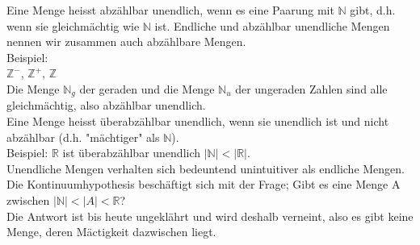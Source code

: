 \documentclass[../gruppenarbeit_1.tex]{subfiles}
\begin{document}
Eine Menge heisst abzählbar unendlich, wenn es eine Paarung mit $\mathbb{N}$ gibt, d.h. wenn sie gleichmächtig wie $\mathbb{N}$ ist.
Endliche und abzählbar unendliche Mengen nennen wir zusammen auch abzählbare Mengen.\\

Beispiel:\\
$\mathbb{Z}^-$, $\mathbb{Z}^+$, $\mathbb{Z}$\\
Die Menge $\mathbb{N}_g$ der geraden und die Menge $\mathbb{N}_u$ der ungeraden Zahlen sind alle gleichmächtig, also abzählbar unendlich.\\

Eine Menge heisst überabzählbar unendlich, wenn sie unendlich ist und nicht abzählbar (d.h. "mächtiger" als $\mathbb{N}$).\\
Beispiel: $\mathbb{R}$ ist überabzählbar unendlich $|\mathbb{N}| < |\mathbb{R}|$.\\

Unendliche Mengen verhalten sich bedeuntend unintuitiver als endliche Mengen.\\

Die Kontinuumhypothesis beschäftigt sich mit der Frage; Gibt es eine Menge A zwischen $|\mathbb{N}| < |A| < \mathbb{R}$?\\
Die Antwort ist bis heute ungeklährt und wird deshalb verneint, also es gibt keine Menge, deren Mäctigkeit dazwischen liegt.
\end{document}

